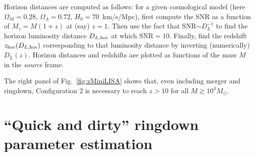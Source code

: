 \documentclass{iopart}
\begin{document}
Horizon distances are computed as follows: for a given cosmological model
(here $\Omega_M = 0.28$, $\Omega_\Lambda = 0.72$, $H_0 = 70$~km/s/Mpc), first
compute the SNR as a function of $M_z=M(1+z)$ at (say) $z=1$. Then use the
fact that SNR$\sim D_L^{-1}$ to find the horizon luminosity distance $D_{L,
  {\rm hor}}$ at which SNR$=10$. Finally, find the redshift $z_{\rm hor}(D_{L,
  {\rm hor}})$ corresponding to that luminosity distance by inverting
(numerically) $D_L(z)$. Horizon distances and redshifts are plotted as
functions of the mass $M$ in the {\it source} frame.

The right panel of Fig.~\ref{fig:zMiniLISA} shows that, even including merger
and ringdown, Configuration 2 is necessary to reach $z>10$ for all $M\gtrsim
10^4 M_\odot$.


\section*{``Quick and dirty'' ringdown parameter estimation}
\end{document}

